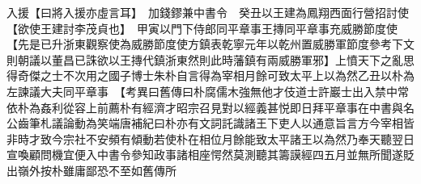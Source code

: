 入援【曰將入援亦虛言耳】　加錢鏐兼中書令　癸丑以王建為鳳翔西面行營招討使【欲使王建討李茂貞也】　甲寅以門下侍郎同平章事王摶同平章事充威勝節度使【先是已升浙東觀察使為威勝節度使方鎮表乾寧元年以乾州置威勝軍節度參考下文則朝議以董昌已誅欲以王摶代鎮浙東然則此時藩鎮有兩威勝軍邪】上憤天下之亂思得奇傑之士不次用之國子博士朱朴自言得為宰相月餘可致太平上以為然乙丑以朴為左諫議大夫同平章事　【考異曰舊傳曰朴腐儒木強無他才伎道士許巖士出入禁中常依朴為姦利從容上前薦朴有經濟才昭宗召見對以經義甚悦即日拜平章事在中書與名公齒筆札議論動為笑端唐補紀曰朴亦有文詞託識諸王下吏人以通意旨言方今宰相皆非時才致今宗社不安頻有傾動若使朴在相位月餘能致太平諸王以為然乃奉天聽翌日宣喚顧問機宜便入中書令參知政事諸相座愕然莫測聽其籌謨經四五月並無所聞遂貶出嶺外按朴雖庸鄙恐不至如舊傳所